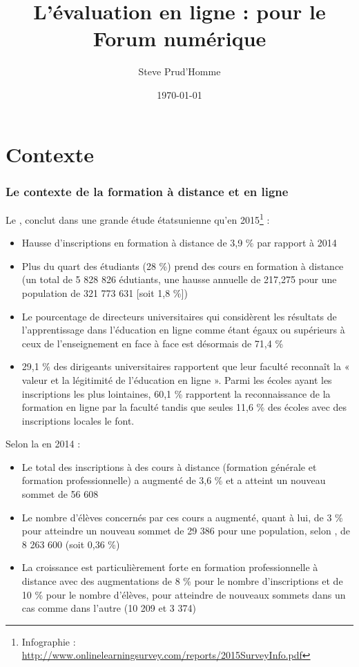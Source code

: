 \documentclass[aspectratio=169]{beamer}
\begin{document}
	\title{L'évaluation en ligne : pour le Forum numérique} 
	\author{Steve Prud'Homme} 
	\date{\today} 

	
	\frame{\titlepage} 
	
	\section{Contexte} 
		\begin{frame}[allowframebreaks]
			\frametitle{Le contexte de la formation à distance et en ligne}
			Le \citet{OLC2015a}, conclut dans une grande étude étatsunienne qu'en 2015\footnote{Infographie : \url {http://www.onlinelearningsurvey.com/reports/2015SurveyInfo.pdf} } :
			\begin {itemize}
				\item Hausse d'inscriptions en formation à distance de 3,9 \% par rapport à 2014
				\item Plus du quart des étudiants (28 \%) prend des cours en formation à distance (un  total de 5 828 826 édutiants, une hausse annuelle de 217,275  pour une population de 321 773 631 [soit 1,8  \%])
				\item Le pourcentage de directeurs universitaires qui considèrent les résultats de l'apprentissage dans l'éducation en ligne comme étant égaux ou supérieurs à ceux de l'enseignement en face à face est désormais de 71,4 \%
				\item 29,1 \% des dirigeants universitaires rapportent que leur faculté reconnaît la « valeur et la légitimité de l'éducation en ligne ». Parmi les écoles ayant les inscriptions les plus lointaines, 60,1 \% rapportent la reconnaissance de la formation en ligne par la faculté tandis que seules 11,6 \% des écoles avec des inscriptions locales le font.
			\end{itemize}
			\framebreak
			Selon la \citet{sofad2015a} en 2014 : 
			\begin {itemize}
				\item Le total des inscriptions à des cours à distance (formation générale et formation professionnelle) a augmenté de 3,6 \% et a atteint un nouveau sommet de 56 608
				\item Le nombre d’élèves concernés par ces cours a augmenté, quant à lui, de 3 \% pour atteindre un nouveau sommet de 29 386 pour une population, selon \citet{is2015a}, de 8 263 600 (soit 0,36 \%)
				\item La croissance est particulièrement forte en formation professionnelle à distance avec des augmentations de 8 \% pour le nombre d’inscriptions et de 10 \% pour le nombre d’élèves, pour atteindre de nouveaux sommets dans un cas comme dans l’autre (10 209 et 3 374)
			\end{itemize}
		\end{frame}
		
\end{document}
